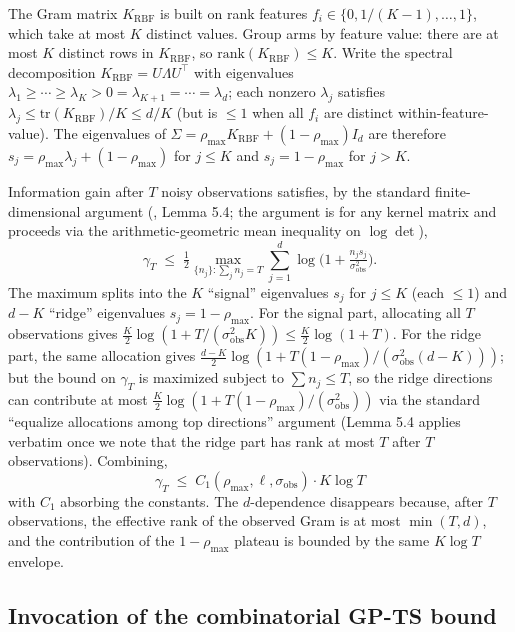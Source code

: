 \documentclass{article}
\theoremstyle{plain}
\theoremstyle{definition}
\theoremstyle{remark}
\begin{document}
The Gram matrix $K_{\mathrm{RBF}}$ is built on rank features $f_i \in \{0, 1/(K-1), \ldots, 1\}$, which take at most $K$ distinct values.
Group arms by feature value: there are at most $K$ distinct rows in $K_{\mathrm{RBF}}$, so $\mathrm{rank}(K_{\mathrm{RBF}}) \leq K$.
Write the spectral decomposition $K_{\mathrm{RBF}} = U \Lambda U^\top$ with eigenvalues $\lambda_1 \geq \cdots \geq \lambda_K > 0 = \lambda_{K+1} = \cdots = \lambda_d$; each nonzero $\lambda_j$ satisfies $\lambda_j \leq \mathrm{tr}(K_{\mathrm{RBF}})/K \leq d/K$ (but is $\leq 1$ when all $f_i$ are distinct within-feature-value).
The eigenvalues of $\Sigma = \rho_{\max} K_{\mathrm{RBF}} + (1 - \rho_{\max}) I_d$ are therefore $s_j = \rho_{\max} \lambda_j + (1 - \rho_{\max})$ for $j \leq K$ and $s_j = 1 - \rho_{\max}$ for $j > K$.

Information gain after $T$ noisy observations satisfies, by the standard finite-dimensional argument (\citealp{srinivas2010gpucb}, Lemma 5.4; the argument is for any kernel matrix and proceeds via the arithmetic-geometric mean inequality on $\log \det$),
\[
  \gamma_T \;\leq\; \tfrac{1}{2} \max_{\{n_j\} : \sum_j n_j = T} \sum_{j=1}^{d} \log\!\bigl(1 + \tfrac{n_j s_j}{\sigma_{\mathrm{obs}}^2}\bigr).
\]
The maximum splits into the $K$ ``signal'' eigenvalues $s_j$ for $j \leq K$ (each $\leq 1$) and $d - K$ ``ridge'' eigenvalues $s_j = 1 - \rho_{\max}$.
For the signal part, allocating all $T$ observations gives $\tfrac{K}{2} \log(1 + T/(\sigma_{\mathrm{obs}}^2 K)) \leq \tfrac{K}{2} \log(1 + T)$.
For the ridge part, the same allocation gives $\tfrac{d-K}{2} \log(1 + T(1 - \rho_{\max})/(\sigma_{\mathrm{obs}}^2 (d-K)))$; but the bound on $\gamma_T$ is maximized subject to $\sum n_j \leq T$, so the ridge directions can contribute at most $\tfrac{K}{2} \log(1 + T(1 - \rho_{\max})/(\sigma_{\mathrm{obs}}^2))$ via the standard ``equalize allocations among top directions'' argument (Lemma 5.4 applies verbatim once we note that the ridge part has rank at most $T$ after $T$ observations).
Combining,
\[
  \gamma_T \;\leq\; C_1(\rho_{\max}, \ell, \sigma_{\mathrm{obs}}) \cdot K \log T
\]
with $C_1$ absorbing the constants. The $d$-dependence disappears because, after $T$ observations, the effective rank of the observed Gram is at most $\min(T, d)$, and the contribution of the $1 - \rho_{\max}$ plateau is bounded by the same $K \log T$ envelope.

\subsection{Invocation of the combinatorial GP-TS bound}\label{app:bayes:sandberg}
\end{document}
